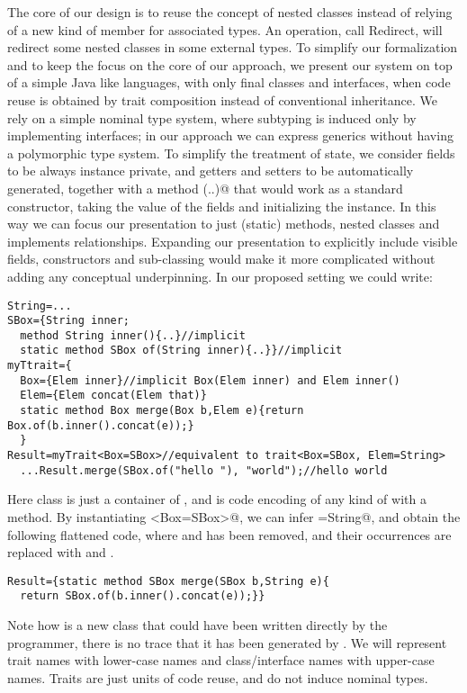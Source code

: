 The core of our design is to reuse the concept of nested classes instead of relying of a new kind of member for
associated types.
An operation, call Redirect, will redirect some nested classes in some external types.
To simplify our formalization and to keep the focus on the core of our approach, we 
present our system on top of a simple 
Java like languages, with only final classes and interfaces, when code reuse is obtained by
trait composition instead of conventional inheritance. 
We rely on a simple nominal type system, where subtyping is induced only by implementing interfaces;
in our approach we can express generics without having a polymorphic type system.
To simplify the treatment of state, we consider fields to be always instance private, and
getters and setters to be automatically generated, together with a \Q@static@ method \Q@of(..)@
that would work as a standard constructor, taking the value of the fields and initializing the instance.
In this way we can focus our presentation to just (static) methods, nested classes and implements relationships.
Expanding our presentation to explicitly include visible fields, constructors and sub-classing would
make it more complicated without adding any conceptual underpinning.
In our proposed setting we could write:
\begin{lstlisting}
String=...
SBox={String inner;
  method String inner(){..}//implicit
  static method SBox of(String inner){..}}//implicit
myTtrait={
  Box={Elem inner}//implicit Box(Elem inner) and Elem inner()
  Elem={Elem concat(Elem that)}
  static method Box merge(Box b,Elem e){return Box.of(b.inner().concat(e));}
  }
Result=myTrait<Box=SBox>//equivalent to trait<Box=SBox, Elem=String>
  ...Result.merge(SBox.of("hello "), "world");//hello world
\end{lstlisting}
Here class \Q@SBox@ is just a container of \Q@String@s, and \Q@myTrait@ is code
encoding \Q@Box@es of any kind of \Q@Elem@ with a \Q@concat@ method.
By instantiating \Q@myTrait<Box=SBox>@, we can infer \Q@Elem=String@, and 
obtain the following flattened code,
where \Q@Box@ and \Q@Elem@ has been removed, and their occurrences are replaced with \Q@SBox@ and \Q@String@.
\begin{lstlisting}
Result={static method SBox merge(SBox b,String e){
  return SBox.of(b.inner().concat(e));}}
\end{lstlisting}

Note how  \Q@Result@ is a new class
that could have been written directly by the programmer,
there is no trace that it has been generated by \Q@myTrait@.
We will represent trait names with lower-case names and class/interface names with upper-case names.
Traits are just units of code reuse, and do not induce nominal types.

